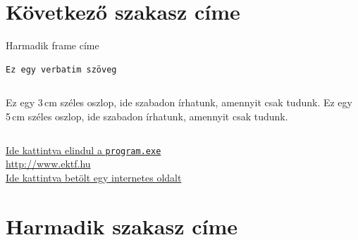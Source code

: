 \documentclass{beamer}
\begin{document}
\section{Következő szakasz címe}

\begin{frame}[fragile]{Harmadik frame címe}{}
{\color{blue}
\begin{verbatim}
Ez egy verbatim szöveg
\end{verbatim}
}\pause
\begin{columns}[t]
\column{3cm}
Ez egy 3\,cm széles oszlop, ide szabadon írhatunk, amennyit csak tudunk.
\column{5cm}\pause
Ez egy 5\,cm széles oszlop, ide szabadon írhatunk, amennyit csak tudunk.
\end{columns}
\pause\bigskip
\href{run:program.exe}{Ide kattintva elindul a \texttt{program.exe}}\pause\\
\url{http://www.ektf.hu}\pause\\
\href{http://www.ektf.hu}{Ide kattintva betölt egy internetes oldalt}
\end{frame}

\section{Harmadik szakasz címe}
\end{document}
